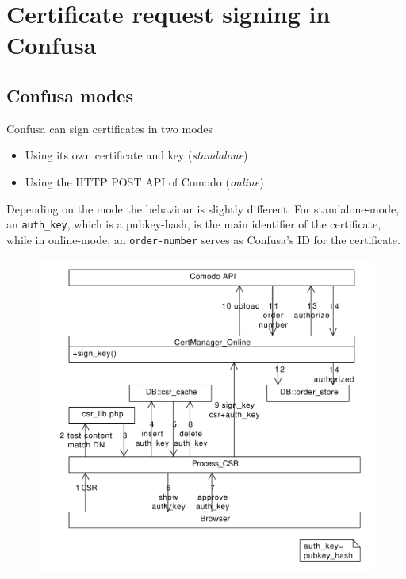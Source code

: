 \documentclass{scrartcl}
\begin{document}
\section{Certificate request signing in Confusa}

\subsection{Confusa modes}

Confusa can sign certificates in two modes

\begin{itemize}
	\item Using its own certificate and key (\emph{standalone})
	\item Using the HTTP POST API of Comodo (\emph{online})
\end{itemize}

Depending on the mode the behaviour is slightly different. For standalone-mode, an \verb+auth_key+, which is a pubkey-hash, is the main identifier of the certificate, while in online-mode, an \verb+order-number+ serves as Confusa's ID for the certificate.

\begin{figure}\label{csr_sign_online}
\begin{center}
\includegraphics[width=\textwidth]{cm_online_flow}
\end{center}
\end{figure}
\end{document}
